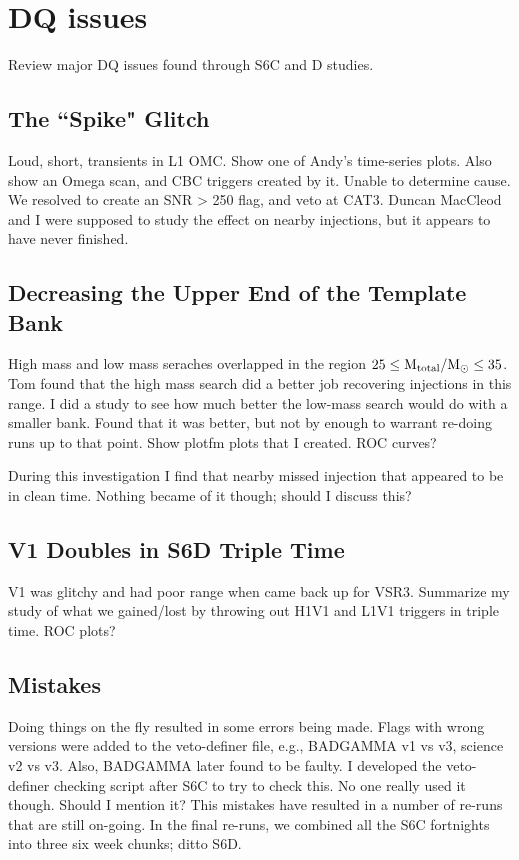 \section{DQ issues}

Review major DQ issues found through S6C and D studies.

\subsection{The ``Spike" Glitch}
Loud, short, transients in L1 OMC. Show one of Andy's time-series plots. Also show an Omega scan, and \ac{CBC} triggers created by it. Unable to determine cause. We resolved to create an \ac{SNR} > 250 flag, and veto at CAT3. Duncan MacCleod and I were supposed to study the effect on nearby injections, but it appears to have never finished.

\subsection{Decreasing the Upper End of the Template Bank}
High mass and low mass seraches overlapped in the region $25 \leq \mathrm{M_{total}}/\mathrm{M_\odot} \leq 35$. Tom found that the high mass search did a better job recovering injections in this range. I did a study to see how much better the low-mass search would do with a smaller bank. Found that it was better, but not by enough to warrant re-doing runs up to that point. Show plotfm plots that I created. ROC curves?

During this investigation I find that nearby missed injection that appeared to be in clean time. Nothing became of it though; should I discuss this?

\subsection{V1 Doubles in S6D Triple Time}

V1 was glitchy and had poor range when came back up for VSR3. Summarize my study of what we gained/lost by throwing out H1V1 and L1V1 triggers in triple time. ROC plots? 

\subsection{Mistakes}

Doing things on the fly resulted in some errors being made. Flags with wrong versions were added to the veto-definer file, e.g., BADGAMMA v1 vs v3, science v2 vs v3. Also, BADGAMMA later found to be faulty. I developed the veto-definer checking script after S6C to try to check this. No one really used it though. Should I mention it? This mistakes have resulted in a number of re-runs that are still on-going. In the final re-runs, we combined all the S6C fortnights into three six week chunks; ditto S6D.

